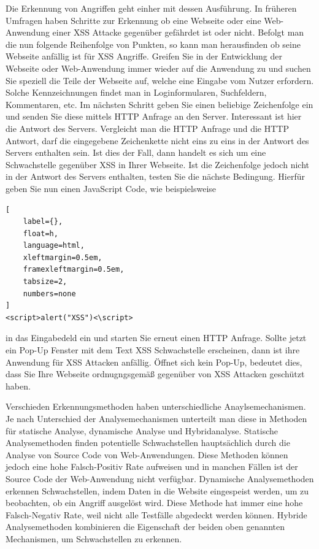 Die Erkennung von Angriffen geht einher mit dessen Ausführung.
In früheren Umfragen haben \textcite[10]{gupta2014} Schritte zur Erkennung ob eine Webseite oder eine Web-Anwendung einer XSS Attacke gegenüber gefährdet ist oder nicht. Befolgt man die nun folgende Reihenfolge von Punkten, so kann man herausfinden ob seine Webseite anfällig ist für XSS Angriffe. Greifen Sie in der Entwicklung der Webseite oder Web-Anwendung immer wieder auf die Anwendung zu und suchen Sie speziell die Teile der Webseite auf, welche eine Eingabe vom Nutzer erfordern. Solche Kennzeichnungen findet man in Loginformularen, Suchfeldern, Kommentaren, etc. Im nächsten Schritt geben Sie einen beliebige Zeichenfolge ein und senden Sie diese mittels HTTP Anfrage an den Server. Interessant ist hier die Antwort des Servers. Vergleicht man die HTTP Anfrage und die HTTP Antwort, darf die eingegebene Zeichenkette nicht eins zu eins in der Antwort des Servers enthalten sein. Ist dies der Fall, dann handelt es sich um eine Schwachstelle gegenüber XSS in Ihrer Webseite.
Ist die Zeichenfolge jedoch nicht in der Antwort des Servers enthalten, testen Sie die nächste Bedingung. Hierfür geben Sie nun einen JavaScript Code, wie beispielsweise
\begin{lstlisting}[
	label={},
	float=h,
	language=html,
	xleftmargin=0.5em,
	framexleftmargin=0.5em,
	tabsize=2,
	numbers=none
]
<script>alert("XSS")<\script>
\end{lstlisting}
in das Eingabedeld ein und starten Sie erneut einen HTTP Anfrage. Sollte jetzt ein Pop-Up Fenster mit dem Text XSS Schwachstelle erscheinen, dann ist ihre Anwendung für XSS Attacken anfällig. Öffnet sich kein Pop-Up, bedeutet dies, dass Sie Ihre Webseite ordnugngsgemäß gegenüber von XSS Attacken geschützt haben.

Verschieden Erkennungsmethoden haben unterschiedliche Anaylsemechanismen. Je nach Unterschied der Analysemechanismen unterteilt man diese in Methoden für statische Analyse, dynamische Analyse und Hybridanalyse. Statische Analysemethoden finden potentielle Schwachstellen hauptsächlich durch die Analyse von Source Code von Web-Anwendungen. Diese Methoden können jedoch eine hohe Falsch-Positiv Rate aufweisen und in manchen Fällen ist der Source Code der Web-Anwendung nicht verfügbar. Dynamische Analysemethoden erkennen Schwachstellen, indem Daten in die Website eingespeist werden, um zu beobachten, ob ein Angriff ausgelöst wird. Diese Methode hat immer eine hohe Falsch-Negativ Rate, weil nicht alle Testfälle abgedeckt werden können. Hybride Analysemethoden kombinieren die Eigenschaft der beiden oben genannten Mechanismen, um Schwachstellen zu erkennen. \autocite[182008]{liu2019}

